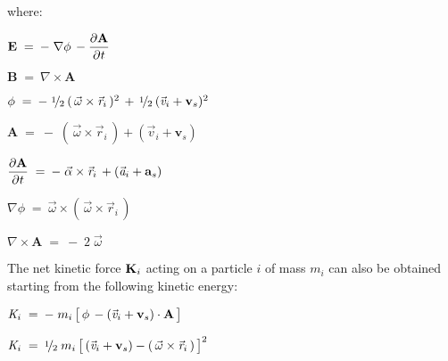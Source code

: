 \documentclass[10pt]{article}
\newcommand{\med}{\raise.5ex\hbox{$\scriptstyle 1$}\kern-.15em/\kern-.09em\lower.25ex\hbox{$\scriptstyle 2$}}
\begin{document}
\par \bigskip \noindent where:

\par \bigskip ${\mathbf{E}} \;=\: - \; \nabla \phi \, - \dfrac{\partial{\mathbf{A}}}{\partial{\hspace{+0.03em}t}}$

\par \bigskip ${\mathbf{B}} \;=\: \nabla \times {\mathbf{A}}$

\par \bigskip $\phi \;=\: - \; \med \: ( \, {\vec{\omega}} \times {\vec{\mathit{r}}}_{i} \, )^{\hspace{+0.006em}2} \, + \, \med \: ({\vec{\mathit{v}}}_{i} + {\mathbf{v}}_s)^{\hspace{+0.006em}2}$

\par \bigskip ${\mathbf{A}} \;=\: - \; ( \, {\vec{\omega}} \times {\vec{\mathit{r}}}_{i} \, ) + ({\vec{\mathit{v}}}_{i} + {\mathbf{v}}_s)$

\par \bigskip $\dfrac{\partial{\mathbf{A}}}{\partial{\hspace{+0.03em}t}} \;=\: - \; {\vec{\alpha}} \times {\vec{\mathit{r}}}_{i} \, + ({\vec{\mathit{a}}}_{i} + {\mathbf{a}}_s)$

\par \bigskip $\nabla \phi \;=\: {\vec{\omega}} \times ( \, {\vec{\omega}} \times {\vec{\mathit{r}}}_{i} \, )$

\par \bigskip $\nabla \times {\mathbf{A}} \;=\: - \; 2 \; {\vec{\omega}}$

\par \bigskip \noindent The net kinetic force ${\mathbf{K}}_{\hspace{+0.009em}i}$ acting on a particle $i$ of mass $m_i$ can also be obtained starting from the following kinetic energy:

\par \bigskip ${\mathit{K}}_{\hspace{+0.009em}i} \;=\: - \; m_i \, \big[ \, \phi \, - ({\vec{\mathit{v}}}_{i} + {\mathbf{v}}_s) \cdot {\mathbf{A}} \, \big]$

\par \bigskip ${\mathit{K}}_{\hspace{+0.009em}i} \;=\: \med \; m_i \, \big[ \, ({\vec{\mathit{v}}}_{i} + {\mathbf{v}}_s) - ( \, {\vec{\omega}} \times {\vec{\mathit{r}}}_{i} \, ) \, \big]^2$
\end{document}
